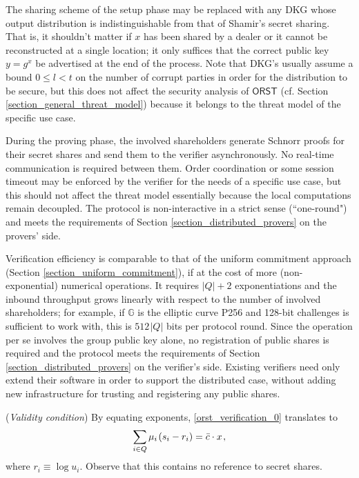 \documentclass{iacrtrans}
\begin{document}
\noindent
The sharing scheme of the setup phase may be replaced
with any DKG whose output distribution
is indistinguishable from that of Shamir's secret sharing.
That is, it shouldn't matter if $x$ has been shared by a dealer
or it cannot be reconstructed at a single location; it only
suffices that the correct public key
$y = g ^ x$ be advertised at the end of the process.
Note that DKG's usually assume a bound $0 \le l < t$
on the number of corrupt parties
in order for the distribution to be secure,
but this does not affect the security analysis of
$\mathsf{ORST}$
(cf. Section \ref{section_general_threat_model})
because it belongs to the threat model of the
specific use case.

During the proving phase,
the involved shareholders generate Schnorr
proofs for their secret shares
and send them to the verifier asynchronously.
No real-time communication is required between them.
Order coordination or some session timeout
may be enforced by the verifier for the needs of a specific use case,
but this should not affect the threat model essentially
because the local computations remain decoupled.
The protocol is non-interactive in a strict sense
(``one-round") and meets the requirements of
Section \ref{section_distributed_provers} on the provers' side.

Verification efficiency is comparable to that of the uniform
commitment approach (Section \ref{section_uniform_commitment}),
if at the cost of more (non-exponential) numerical operations.
It requires $|Q| + 2$ exponentiations
and the inbound throughput grows linearly
with respect to the number of involved shareholders;
for example, if $\mathbb{G}$ is the elliptic curve P256 and
128-bit challenges is sufficient to work with,
this is $512 \hspace{1pt} |Q|$ bits per protocol round.
Since the operation per se involves
the group public key alone, no registration of public shares is
required and the protocol meets
the requirements of Section \ref{section_distributed_provers}
on the verifier's side.
Existing verifiers need only extend
their software in order to support the distributed case,
without adding new infrastructure
for trusting and registering any public shares.

\begin{rem}\label{rem_orst_verification_exponents}
(\textit{Validity condition})
By equating exponents,
\eqref{orst_verification_0} translates to
\vspace{5pt}
\begin{equation}\label{orst_verification_exponents}
\sum_{i \in Q} \mu_i\hspace{1pt} (s_i - r_i) =
\bar{c} \cdot x\hspace{1pt},
\vspace{5pt}
\end{equation}
where $r_i \equiv \log u_i$.
Observe that this contains no reference to secret shares.
\end{rem}
\end{document}
